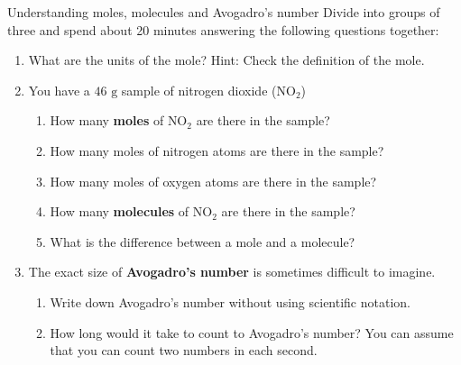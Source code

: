             \begin{groupdiscussion}{Understanding moles, molecules and Avogadro's number
      }
            \nopagebreak
      \label{m38717*id279596}Divide into groups of three and spend about 20 minutes answering the following questions together:\par 
      \label{m38717*id279603}\begin{enumerate}[noitemsep, label=\textbf{\arabic*}. ] 
            \label{m38717*uid39}\item What are the units of the mole? Hint: Check the definition of the mole.
\label{m38717*uid40}\item You have a $46 \text{ g}$ sample of nitrogen dioxide ($\text{NO}_{2}$)
\label{m38717*id279631}\begin{enumerate}[noitemsep, label=\textbf{\alph*}. ] 
\item How many \textbf{moles} of $\text{NO}_{2}$ are there in the sample?
\item How many moles of nitrogen atoms are there in the sample?
\item How many moles of oxygen atoms are there in the sample?
\item How many \textbf{molecules} of $\text{NO}_{2}$ are there in the sample?
\item What is the difference between a mole and a molecule?
\end{enumerate}
        \label{m38717*uid44}\item The exact size of \textbf{Avogadro's number} is sometimes difficult to imagine.
\label{m38717*id279703}\begin{enumerate}[noitemsep, label=\textbf{\alph*}. ] 
            \label{m38717*uid45}\item Write down Avogadro's number without using scientific notation.
\label{m38717*uid46}\item How long would it take to count to Avogadro's number? You can assume that you can count two numbers in each second.
\end{enumerate}
        \end{enumerate}
\end{groupdiscussion}



